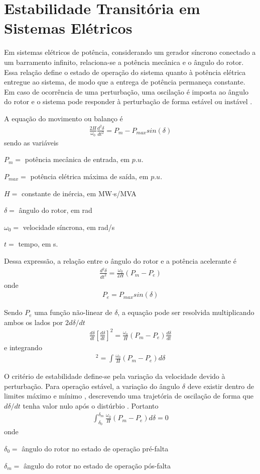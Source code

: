 \documentclass[12pt,oneside,a4paper,chapter=TITLE,section=TITLE,sumario=tradicional,english,brazil]{abntex2}
\begin{document}
\section{Estabilidade Transitória em Sistemas Elétricos}
Em sistemas elétricos de potência, considerando um gerador síncrono conectado a um barramento infinito, relaciona-se a potência mecânica e o ângulo do rotor. Essa relação define o estado de operação do sistema quanto à potência elétrica entregue ao sistema, de modo que a entrega de potência permaneça constante. Em caso de ocorrência de uma perturbação, uma oscilação é imposta ao ângulo do rotor e o sistema pode responder à perturbação de forma estável ou instável \cite{kundur1994}.\par
A equação do movimento ou balanço \cite{kundur1994} é
\begin{gather}
\frac{2H}{\omega_{0}}\frac{d^2\delta}{dt^2}=P_{m}-P_{max}sin(\delta)
\end{gather}
sendo as variáveis
\par
$P_{m} =$ potência mecânica de entrada, em $p.u.$\par 
$P_{max} =$ potência elétrica máxima de saída, em $p.u.$\par
$H =$ constante de inércia, em MW$\cdot$s/MVA\par 
$\delta =$ ângulo do rotor, em rad\par 
$\omega_{0} =$ velocidade síncrona, em rad/s\par 
$t =$ tempo, em s.
\par 
Dessa expressão, a relação entre o ângulo do rotor e a potência acelerante é
\begin{gather}
\frac{d^2\delta}{dt^2} = \frac{\omega_{0}}{2H}(P_{m}-P_{e})
\end{gather}
onde
\begin{gather}
P_{e} = P_{max}sin(\delta)
\end{gather}
\par 
Sendo $P_{e}$ uma função não-linear de $\delta$, a equação pode ser resolvida multiplicando ambos os lados por $2d\delta/dt$
\begin{gather}
\frac{d\delta}{dt}[\frac{d\delta}{dt}]^2 = \frac{\omega_{0}}{H}(P_{m}-P_{e})\frac{d\delta}{dt}
\end{gather}
e integrando
\begin{gather}
[\frac{d\delta}{dt}]^2 = \int{\frac{\omega_{0}}{H}(P_{m}-P_{e})d\delta}
\end{gather}
\par 
O critério de estabilidade define-se pela variação da velocidade devido à perturbação. Para operação estável, a variação do ângulo $\delta$ deve existir dentro de limites máximo e mínimo \cite{kundur1994}, descrevendo uma trajetória de oscilação de forma que $d\delta/dt$ tenha valor nulo após o distúrbio \cite{kundur1994}. Portanto
\begin{gather}
\int_{\delta_{0}}^{\delta_{m}} \frac{\omega_{0}}{H}(P_{m}-P_{e}) d\delta=0
\end{gather}
onde\par 
$\delta_{0}=$ ângulo do rotor no estado de operação pré-falta\par
$\delta_{m}=$ ângulo do rotor no estado de operação pós-falta\par 
\end{document}
